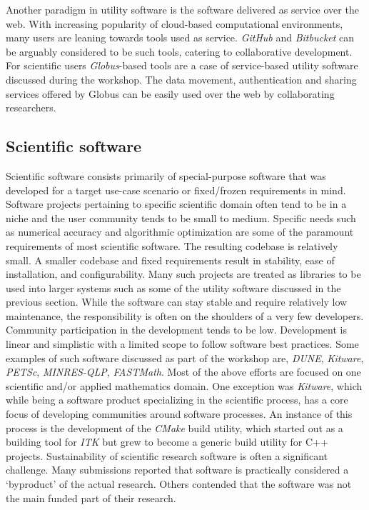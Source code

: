 \documentclass[11pt, oneside]{amsart}
\begin{document}
Another paradigm in utility software is the software delivered as service over
the web. With increasing popularity of cloud-based computational environments,
many users are leaning towards tools used as service. \emph{GitHub} and
\emph{Bitbucket} can be arguably considered to be such tools, catering to
collaborative development. For scientific users \emph{Globus}-based tools are
a case of service-based utility software discussed during the workshop. The
data movement, authentication and sharing services offered by Globus can be
easily used over the web by collaborating researchers.

\subsection{Scientific software}
Scientific software consists primarily of special-purpose software that was
developed for a target use-case scenario or fixed/frozen requirements in mind.
Software projects pertaining to specific scientific domain often tend to be in
a niche and the user community tends to be small to medium.
%
Specific needs such as numerical accuracy and algorithmic optimization are some
of the paramount requirements of most scientific software.
%
The resulting codebase is relatively small. A smaller codebase and fixed
requirements result in stability, ease of installation, and configurability.
Many such projects are treated as libraries to be used into larger systems such as
some of the utility software discussed in the previous section.
%
While the
software can stay stable and require relatively low maintenance, the
responsibility is often on the shoulders of a very few developers.
%
Community
participation in the development tends to be low. Development is linear and
simplistic with a limited scope to follow software best practices.
%
Some examples of such software discussed as part of the workshop are,
\emph{DUNE}, \emph{Kitware}, \emph{PETSc}, \emph{MINRES-QLP}, \emph{FASTMath}.
Most of the above efforts are focused on one scientific and/or applied
mathematics domain. One exception was \emph{Kitware}, which while being a
software product specializing in the scientific process, has a core focus of
developing communities around software processes. An instance of this process
is the development of the \emph{CMake} build utility, which started out as a
building tool for \emph{ITK} but grew to become a generic build utility for C++
projects.
%
Sustainability of scientific research software is often a significant
challenge. Many submissions reported that software is practically considered a
`byproduct' of the actual research. Others contended that the software was not
the main funded part of their research.
\end{document}

